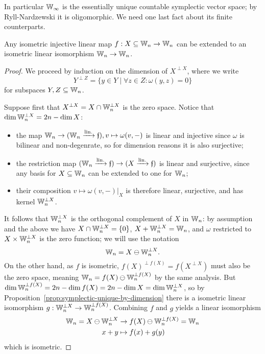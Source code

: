 In particular $\mathbb{W}_\infty$ is the essentially unique countable symplectic vector space;
by Ryll-Nardzewski it is oligomorphic.
We need one last fact about its finite counterparts.
\begin{proposition} \label{prop:symplectic-witt-extension}
    Any isometric injective linear map $f : X \subseteq \mathbb{W}_n \to \mathbb{W}_n$ 
    can be extended to an isometric linear isomorphism $\mathbb{W}_n \to \mathbb{W}_n$.
\end{proposition}
\begin{proof}
    We proceed by induction on the dimension of $X^{\perp X}$,
    where we write
    \[
        Y^{\perp Z} = \{y \in Y \mid \forall z \in Z : \omega(y, z) = 0\}
    \]
    for subspaces $Y, Z \subseteq \mathbb{W}_n$.
    
    Suppose first that $X^{\perp X} = X \cap \mathbb{W}_n^{\perp X}$ is the zero space.
    Notice that $\dim \mathbb{W}_n^{\perp X} = 2n - \dim X$:
    \begin{itemize}
        \item the map 
            $\mathbb{W}_n \to (\mathbb{W}_n \xrightarrow{\text{lin.}} \mathfrak{f}), v \mapsto \omega(v, -)$ 
        is linear and injective since $\omega$ is bilinear and non-degenrate, 
        so for dimension reasons it is also surjective;

        \item the restriction map 
            $(\mathbb{W}_n \xrightarrow{\text{lin.}} \mathfrak{f}) \to (X \xrightarrow{\text{lin.}} \mathfrak{f})$ 
        is linear and surjective, 
        since any basis for $X \subseteq \mathbb{W}_n$ can be extended to one for $\mathbb{W}_n$;
        
        \item their composition 
            $v \mapsto \omega(v, -)|_X$ 
        is therefore linear, surjective, and has kernel $\mathbb{W}_n^{\perp X}$.
    \end{itemize}
    It follows that $\mathbb{W}_n^{\perp X}$ is the orthogonal complement of $X$ in $\mathbb{W}_n$: 
    by assumption and the above we have 
        $X \cap \mathbb{W}_n^{\perp X} = \{0\}$, $X + \mathbb{W}_n^{\perp X} = \mathbb{W}_n$, 
    and $\omega$ restricted to $X \times \mathbb{W}_n^{\perp X}$ is the zero function;
    we will use the notation \[
        \mathbb{W}_n = X \ominus \mathbb{W}_n^{\perp X}.
    \]
    On the other hand, as $f$ is isometric, 
    $f(X)^{\perp f(X)} = f(X^{\perp X})$ must also be the zero space,
    meaning $\mathbb{W}_n = f(X) \ominus \mathbb{W}_n^{\perp f(X)}$ by the same analysis.
    But $\dim \mathbb{W}_n^{\perp f(X)} = 2n - \dim f(X) = 2n - \dim X = \dim \mathbb{W}_n^{\perp X}$,
    so by Proposition~\ref{prop:symplectic-unique-by-dimension} there is a isometric 
    linear isomorphism $g : \mathbb{W}_n^{\perp X} \to \mathbb{W}_n^{\perp f(X)}$.
    Combining $f$ and $g$ yields a linear isomorphism 
    \begin{align*}
        \mathbb{W}_n = X \ominus \mathbb{W}_n^{\perp X} &\to f(X) \ominus \mathbb{W}_n^{\perp f(X)} = \mathbb{W}_n \\
        x + y &\mapsto f(x) + g(y)
    \end{align*} 
    which is isometric.
    

\end{proof}
